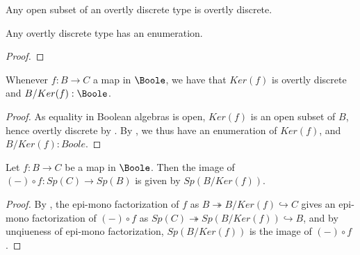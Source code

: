 \begin{lemma}\label{OpenOfOdiscIsOdisc}
  Any open subset of an overtly discrete type is overtly discrete. 
\end{lemma}

\begin{lemma}\label{OdiscEnumeration}
  Any overtly discrete type has an enumeration. 
\end{lemma}
\begin{proof}

\end{proof}

\begin{corollary}
  Whenever $f:B\to C$ a map in $\Boole$, we have that
  $Ker(f)$ is overtly discrete and $B/Ker(f):\Boole$.
\end{corollary}
\begin{proof}
  As equality in Boolean algebras is open, 
  $Ker(f)$ is an open subset of $B$, hence overtly discrete by . 
  By , we thus have an enumeration of $Ker(f)$, and $B/Ker(f):Boole$. 
\end{proof}

\begin{lemma}\label{imageAsQuotientKernel}
Let $f:B \to C$ be a map in $\Boole$. 
Then the image of $(-)\circ f : Sp(C) \to Sp(B)$ is given by 
$Sp(B/Ker(f))$. 
\end{lemma}
\begin{proof}
  By , the epi-mono factorization of $f$ as 
  $B\twoheadrightarrow B/Ker(f) \hookrightarrow C$
  gives an epi-mono factorization of $(-) \circ f$ as $Sp(C) \twoheadrightarrow Sp(B/Ker(f)) \hookrightarrow B$, 
  and by unqiueness of epi-mono factorization, $Sp(B/Ker(f))$ is the image of $(-)\circ f$. 
\end{proof}
